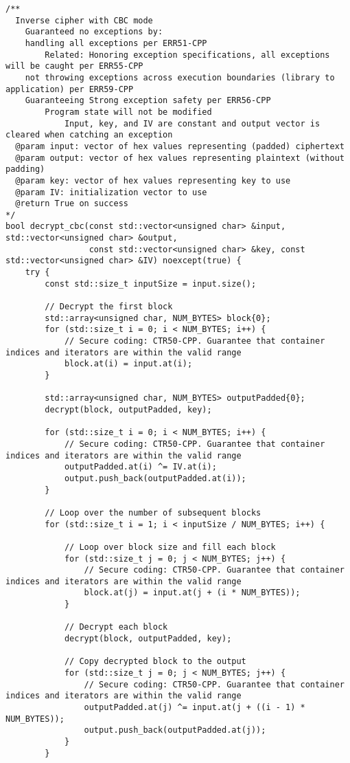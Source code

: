 \documentclass[a4paper,12pt]{article}
\begin{document}
{\begin{lstlisting}
/**
  Inverse cipher with CBC mode
    Guaranteed no exceptions by:
    handling all exceptions per ERR51-CPP
        Related: Honoring exception specifications, all exceptions will be caught per ERR55-CPP
    not throwing exceptions across execution boundaries (library to application) per ERR59-CPP
    Guaranteeing Strong exception safety per ERR56-CPP
        Program state will not be modified
            Input, key, and IV are constant and output vector is cleared when catching an exception
  @param input: vector of hex values representing (padded) ciphertext
  @param output: vector of hex values representing plaintext (without padding)
  @param key: vector of hex values representing key to use
  @param IV: initialization vector to use
  @return True on success
*/
bool decrypt_cbc(const std::vector<unsigned char> &input, std::vector<unsigned char> &output,
                 const std::vector<unsigned char> &key, const std::vector<unsigned char> &IV) noexcept(true) {
    try {
        const std::size_t inputSize = input.size();

        // Decrypt the first block
        std::array<unsigned char, NUM_BYTES> block{0};
        for (std::size_t i = 0; i < NUM_BYTES; i++) {
            // Secure coding: CTR50-CPP. Guarantee that container indices and iterators are within the valid range
            block.at(i) = input.at(i);
        }

        std::array<unsigned char, NUM_BYTES> outputPadded{0};
        decrypt(block, outputPadded, key);

        for (std::size_t i = 0; i < NUM_BYTES; i++) {
            // Secure coding: CTR50-CPP. Guarantee that container indices and iterators are within the valid range
            outputPadded.at(i) ^= IV.at(i);
            output.push_back(outputPadded.at(i));
        }

        // Loop over the number of subsequent blocks
        for (std::size_t i = 1; i < inputSize / NUM_BYTES; i++) {

            // Loop over block size and fill each block
            for (std::size_t j = 0; j < NUM_BYTES; j++) {
                // Secure coding: CTR50-CPP. Guarantee that container indices and iterators are within the valid range
                block.at(j) = input.at(j + (i * NUM_BYTES));
            }

            // Decrypt each block
            decrypt(block, outputPadded, key);

            // Copy decrypted block to the output
            for (std::size_t j = 0; j < NUM_BYTES; j++) {
                // Secure coding: CTR50-CPP. Guarantee that container indices and iterators are within the valid range
                outputPadded.at(j) ^= input.at(j + ((i - 1) * NUM_BYTES));
                output.push_back(outputPadded.at(j));
            }
        }



\end{lstlisting}}
\end{document}
